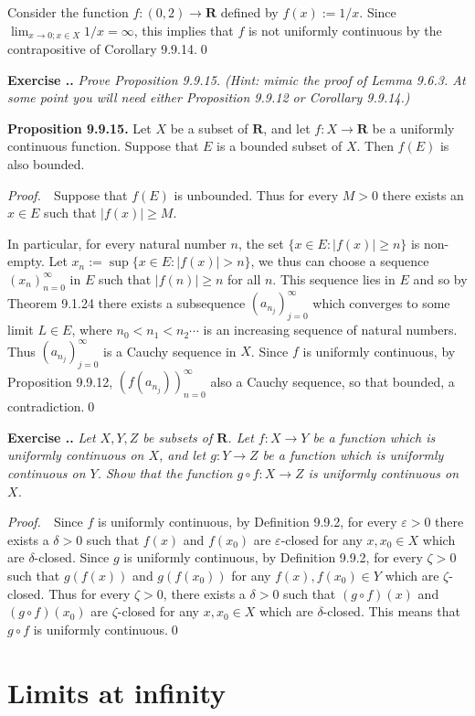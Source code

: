 \documentclass{book}
\newcommand{\pff}{\vspace{.25em}\noindent\emph{Proof.}~~}
\newcommand{\titl}[1]{\noindent\textbf{#1}}
\newcounter{Exercise}[section]
\renewcommand{\theExercise}{\thesection.\arabic{Exercise}.}
\newcommand{\new}{\vspace{1.5em}\noindent\textbf{{Exercise \stepcounter{Exercise}\textbf{\theExercise}}} }
\begin{document}
Consider the function $f:(0,2)\to\mathbf{R}$ defined by $f(x):=1/x$. Since $\lim_{x\to 0;x\in X}1/x=\infty$, this implies that $f$ is not uniformly continuous by the contrapositive of Corollary 9.9.14.\qed

\new\emph{Prove Proposition 9.9.15. (Hint: mimic the proof of Lemma 9.6.3. At some point you will need either Proposition 9.9.12 or Corollary 9.9.14.)}

\begin{framed}
\titl{Proposition 9.9.15.} Let $X$ be a subset of $\mathbf{R}$, and let $f:X\to\mathbf{R}$ be a uniformly continuous function. Suppose that $E$ is a bounded subset of $X$. Then $f(E)$ is also bounded.
\end{framed}

\pff Suppose that $f(E)$ is unbounded. Thus for every $M>0$ there exists an $x\in E$ such that $|f(x)|\geq M$.

In particular, for every natural number $n$, the set $\{x\in E: |f(x)|\geq n\}$ is non-empty. Let $x_n:=\sup\{x\in E: |f(x)|> n\}$, we thus can choose a sequence $(x_n)_{n=0}^{\infty}$ in $E$ such that $|f(n)|\geq n$ for all $n$. This sequence lies in $E$ and so by Theorem 9.1.24 there exists a subsequence $(a_{n_j})_{j=0}^{\infty}$ which converges to some limit $L\in E$, where $n_0<n_1<n_2\cdots$ is an increasing sequence of natural numbers. Thus $(a_{n_j})_{j=0}^{\infty}$ is a Cauchy sequence in $X$. Since $f$ is uniformly continuous, by Proposition 9.9.12, $(f(a_{n_j}))_{n=0}^{\infty}$ also a Cauchy sequence, so that bounded, a contradiction.\qed

\new\emph{Let $X,Y,Z$ be subsets of $\mathbf{R}$. Let $f:X\to Y$ be a function which is uniformly continuous on $X$, and let $g:Y\to Z$ be a function which is uniformly continuous on $Y$. Show that the function $g\circ f:X\to Z$ is uniformly continuous on $X$.}

\pff Since $f$ is uniformly continuous, by Definition 9.9.2, for every $\varepsilon>0$ there exists a $\delta>0$ such that $f(x)$ and $f(x_0)$ are $\varepsilon$-closed for any $x,x_0\in X$ which are $\delta$-closed. Since $g$ is uniformly continuous, by Definition 9.9.2, for every $\zeta>0$ such that $g(f(x))$ and $g(f(x_0))$ for any $f(x),f(x_0)\in Y$ which are $\zeta$-closed. Thus for every $\zeta>0$, there exists a $\delta>0$ such that $(g\circ f)(x)$ and $(g\circ f)(x_0)$ are $\zeta$-closed for any $x,x_0\in X$ which are $\delta$-closed. This means that $g\circ f$ is uniformly continuous.\qed

\section{Limits at infinity}
\end{document}
